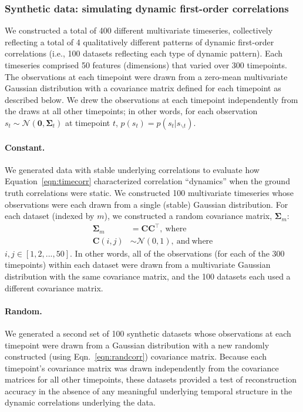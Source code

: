 \documentclass[english]{article}
\begin{document}
\subsubsection*{Synthetic data: simulating dynamic first-order correlations}
We constructed a total of 400 different multivariate timeseries,
collectively reflecting a total of 4 qualitatively different patterns
of dynamic first-order correlations (i.e., 100 datasets reflecting each type of
dynamic pattern).  Each timeseries comprised 50 features (dimensions)
that varied over 300 timepoints.  The observations at each timepoint
were drawn from a zero-mean multivariate Gaussian distribution with a
covariance matrix defined for each timepoint as described below.  We
drew the observations at each timepoint independently from the draws
at all other timepoints; in other words, for each observation
$s_t \sim \mathcal{N}\left(\mathbf{0}, \mathbf{\Sigma}_t\right)$ at
timepoint $t$, $p(s_t) = p(s_t | s_{\backslash t})$.

\paragraph*{Constant.}  We generated data with stable underlying
correlations to evaluate how Equation~\ref{eqn:timecorr} characterized
correlation ``dynamics'' when the ground truth correlations were
static.  We constructed 100 multivariate timeseries whose observations
were each drawn from a single (stable) Gaussian distribution.  For
each dataset (indexed by $m$), we constructed a random covariance matrix,
$\mathbf{\Sigma}_m$:
\begin{align}
   \mathbf{\Sigma}_m &= \mathbf{C}
                                          \mathbf{C}^\top\mathrm{,~where}\label{eqn:randcorr}\\
  \mathbf{C}(i, j) &\sim \mathcal{N}(0, 1)\mathrm{,~and~where}
  \end{align}
  $i, j \in \left[1, 2, ..., 50 \right]$.  In other words, all of the
  observations (for each of the 300 timepoints) within each dataset
  were drawn from a multivariate Gaussian distribution with the same
  covariance matrix, and the 100 datasets each used a different
  covariance matrix.

  \paragraph*{Random.}  We generated a second set of 100 synthetic
  datasets whose observations at each timepoint were drawn from a
  Gaussian distribution with a new randomly constructed (using
  Eqn.~\ref{eqn:randcorr}) covariance matrix.  Because each
  timepoint's covariance matrix was drawn independently from the
  covariance matrices for all other timepoints, these datasets
  provided a test of reconstruction accuracy in the absence of any
  meaningful underlying temporal structure in the dynamic correlations
  underlying the data.
\end{document}
